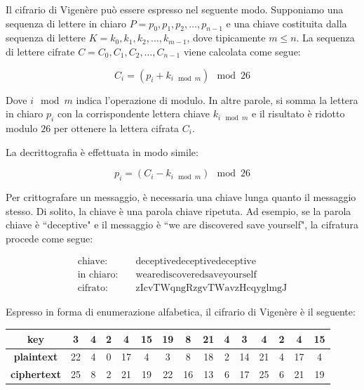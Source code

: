 Il cifrario di Vigenère può essere espresso nel seguente modo. Supponiamo una sequenza
di lettere in chiaro $P = p_0, p_1, p_2, \ldots, p_{n-1}$ e una chiave costituita dalla
sequenza di lettere $K = k_0, k_1, k_2, \ldots, k_{m-1}$, dove tipicamente $m \leq n$.
La sequenza di lettere cifrate $C = C_0, C_1, C_2, \ldots, C_{n-1}$ viene calcolata come segue:

\[
    C_i = (p_i + k_{i \mod m}) \mod 26
\]

Dove $i \mod m$ indica l'operazione di modulo. In altre parole, si somma la lettera in chiaro
$p_i$ con la corrispondente lettera chiave $k_{i \mod m}$ e il risultato è ridotto modulo $26$
per ottenere la lettera cifrata $C_i$.

La decrittografia è effettuata in modo simile:

\[
p_i = (C_i - k_{i \mod m}) \mod 26
\]

Per crittografare un messaggio, è necessaria una chiave lunga quanto il messaggio stesso. Di solito,
la chiave è una parola chiave ripetuta. Ad esempio, se la parola chiave è ``deceptive" e il messaggio
è ``we are discovered save yourself", la cifratura procede come segue:

\begin{align*}
\text{chiave:} & \quad \text{deceptivedeceptivedeceptive} \\
\text{in chiaro:} & \quad \text{wearediscoveredsaveyourself} \\
\text{cifrato:} & \quad \text{zIcvTWqngRzgvTWavzHcqyglmgJ}
\end{align*}

Espresso in forma di enumerazione alfabetica, il cifrario di Vigenère è il seguente:

\begin{table}[H]
    \centering
    \begin{tabular}{|c|cccccccccccccc|}
    \hline
    \textbf{key} & 3 & 4 & 2 & 4 & 15 & 19 & 8 & 21 & 4 & 3 & 4 & 2 & 4 & 15 \\
    \hline
    \textbf{plaintext} & 22 & 4 & 0 & 17 & 4 & 3 & 8 & 18 & 2 & 14 & 21 & 4 & 17 & 4 \\
    \hline
    \textbf{ciphertext} & 25 & 8 & 2 & 21 & 19 & 22 & 16 & 13 & 6 & 17 & 25 & 6 & 21 & 19 \\
    \hline
    \end{tabular}
\end{table}


